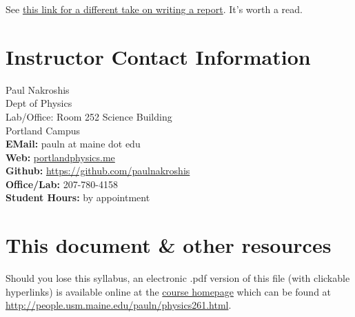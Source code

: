 \documentclass[justified]{tufte-handout}
\begin{document}
See \href{https://compphysics.github.io/ComputationalPhysicsMSU/doc/pub/projectwriting/html/projectwriting-bs.html}{this link for a different take on writing a report}. It's worth a read. 

\pagebreak
\section{Instructor Contact Information}
Paul Nakroshis\\
Dept of Physics\\
Lab/Office: Room 252 Science Building\\
Portland Campus\\
\hfill {\bf EMail:} {pauln at maine dot edu}\\
{\bf Web:} \href{portlandphysics.me}{portlandphysics.me}\\ 
{\bf Github:} \href{https://github.com/paulnakroshis}{https://github.com/paulnakroshis}\\
{\bf Office/Lab:} 207-780-4158\\
{\bf Student Hours:}  by appointment\\


\section{This document \& other resources}
 Should you lose this syllabus, an electronic .pdf version of this file (with clickable hyperlinks)  is available online at the \href{portlandphysics.me/physics261}{course homepage}  which can be found at \\ \href{portlandphysics.me/physics261}{http://people.usm.maine.edu/pauln/physics261.html}.\\
\end{document}
